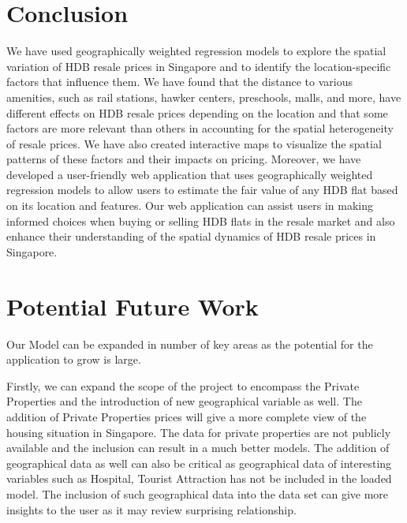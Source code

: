 \documentclass[manuscript,screen]{acmart}
\begin{document}
\hypertarget{conclusion}{%
\section{\texorpdfstring{\textbf{Conclusion}}{Conclusion}}\label{conclusion}}

We have used geographically weighted regression models to explore the
spatial variation of HDB resale prices in Singapore and to identify the
location-specific factors that influence them. We have found that the
distance to various amenities, such as rail stations, hawker centers,
preschools, malls, and more, have different effects on HDB resale prices
depending on the location and that some factors are more relevant than
others in accounting for the spatial heterogeneity of resale prices. We
have also created interactive maps to visualize the spatial patterns of
these factors and their impacts on pricing. Moreover, we have developed
a user-friendly web application that uses geographically weighted
regression models to allow users to estimate the fair value of any HDB
flat based on its location and features. Our web application can assist
users in making informed choices when buying or selling HDB flats in the
resale market and also enhance their understanding of the spatial
dynamics of HDB resale prices in Singapore.

\hypertarget{potential-future-work}{%
\section{\texorpdfstring{\textbf{Potential Future
Work}}{Potential Future Work}}\label{potential-future-work}}

Our Model can be expanded in number of key areas as the potential for
the application to grow is large.

Firstly, we can expand the scope of the project to encompass the Private
Properties and the introduction of new geographical variable as well.
The addition of Private Properties prices will give a more complete view
of the housing situation in Singapore. The data for private properties
are not publicly available and the inclusion can result in a much better
models. The addition of geographical data as well can also be critical
as geographical data of interesting variables such as Hospital, Tourist
Attraction has not be included in the loaded model. The inclusion of
such geographical data into the data set can give more insights to the
user as it may review surprising relationship.
\end{document}
